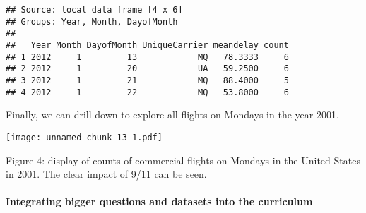 \documentclass[]{article}
\newenvironment{Shaded}{\begin{snugshade}}{\end{snugshade}}
\newcommand{\KeywordTok}[1]{\textcolor[rgb]{0.13,0.29,0.53}{\textbf{{#1}}}}
\newcommand{\DataTypeTok}[1]{\textcolor[rgb]{0.13,0.29,0.53}{{#1}}}
\newcommand{\DecValTok}[1]{\textcolor[rgb]{0.00,0.00,0.81}{{#1}}}
\newcommand{\StringTok}[1]{\textcolor[rgb]{0.31,0.60,0.02}{{#1}}}
\newcommand{\NormalTok}[1]{{#1}}
\begin{document}
\begin{verbatim}
## Source: local data frame [4 x 6]
## Groups: Year, Month, DayofMonth
## 
##   Year Month DayofMonth UniqueCarrier meandelay count
## 1 2012     1         13            MQ   78.3333     6
## 2 2012     1         20            UA   59.2500     6
## 3 2012     1         21            MQ   88.4000     5
## 4 2012     1         22            MQ   53.8000     6
\end{verbatim}

Finally, we can drill down to explore all flights on Mondays in the year
2001.

\begin{Shaded}
\end{Shaded}

\texttt{[image: unnamed-chunk-13-1.pdf]}

Figure 4: display of counts of commercial flights on Mondays in the
United States in 2001. The clear impact of 9/11 can be seen.

\paragraph{Integrating bigger questions and datasets into the
curriculum}\label{integrating-bigger-questions-and-datasets-into-the-curriculum}
\end{document}
